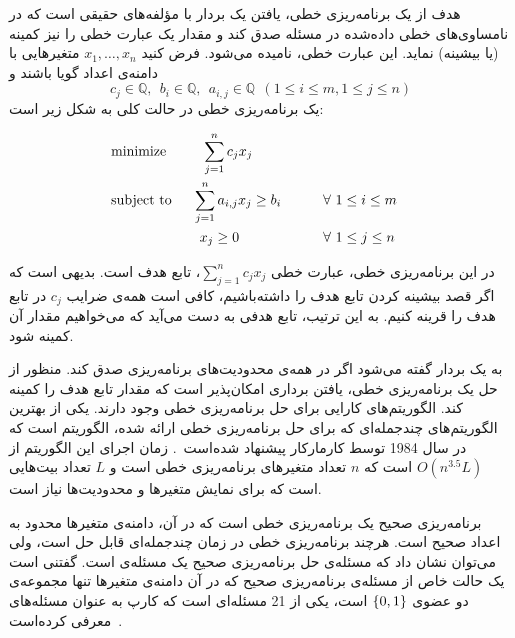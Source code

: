 هدف از یک برنامه‌ریزی خطی، یافتن یک بردار با مؤلفه‌های حقیقی است که در نامساوی‌های خطی داده‌شده در مسئله صدق کند و مقدار یک عبارت خطی را نیز کمینه (یا بیشینه) نماید. این عبارت خطی،  نامیده می‌شود. فرض کنید $x_{1}, \ldots, x_{n}$ متغیر‌هایی با دامنه‌ی اعداد گویا باشند و
$$c_{j} \in \mathbb{Q}, \ \ b_i \in \mathbb{Q}, \ \ a_{i, j} \in \mathbb{Q} \ \ (1 \leq i \leq m, 1 \leq j \leq n)$$
یک برنامه‌ریزی خطی در حالت کلی به شکل زیر است:
\begin{latin}
\begin{alignat}{3}
    & \text{minimize}  \quad && \ {\sum_{j=1}^{n} {c_{j} x_{j}}} \notag \\
    & \text{subject to}  \quad 
		&& \!\!{\sum_{j=1}^{n} {a_{i, j} x_{j}} \geq b_{i}} && \qquad {\forall \ 1 \leq i \leq m} \notag \\
    		&&& x_{j} \geq 0 && \qquad {\forall \ 1 \leq j \leq n} \notag
\end{alignat}
\end{latin}


در این برنامه‌ریزی خطی، عبارت خطی $\sum_{j=1}^{n} {c_{j} x_{j}}$، تابع هدف است. بدیهی است که اگر قصد بیشینه کردن تابع هدف را داشته‌باشیم، کافی است همه‌ی ضرایب $c_j$ در تابع هدف را قرینه کنیم. به این ترتیب، تابع هدفی به دست می‌آید که می‌خواهیم مقدار آن کمینه شود.

به یک بردار  گفته می‌شود اگر در همه‌ی محدودیت‌های برنامه‌ریزی صدق کند. منظور از حل یک برنامه‌ریزی خطی، یافتن برداری امکان‌پذیر است که مقدار تابع هدف را کمینه کند. الگوریتم‌های کارایی برای حل برنامه‌ریزی خطی وجود دارند. یکی از بهترین الگوریتم‌های چند‌جمله‌ای که برای حل برنامه‌ریزی خطی ارائه شده، الگوریتم
است که در سال 1984 توسط کارمارکار پیشنهاد شده‌است~\cite{LP-poly}. زمان اجرای این الگوریتم از $O(n^{3.5} L )$ است که $n$ تعداد متغیر‌های برنامه‌ریزی خطی است و $L$ تعداد بیت‌هایی است که برای نمایش متغیر‌ها و محدودیت‌ها نیاز است.


برنامه‌ریزی صحیح یک برنامه‌ریزی خطی است که در آن، دامنه‌ی متغیر‌ها محدود به اعداد صحیح است. هر‌چند برنامه‌ریزی‌ خطی در زمان چند‌جمله‌ای قابل حل است، ولی می‌توان نشان داد که مسئله‌ی حل برنامه‌ریزی صحیح یک مسئله‌ی  است. گفتنی است یک حالت خاص از مسئله‌ی برنامه‌ریزی صحیح که در آن دامنه‌ی متغیر‌ها تنها مجموعه‌ی دو عضوی ${\{ 0, 1 \}}$ است، یکی از 21 مسئله‌ای است که کارپ به عنوان مسئله‌های  معرفی کرده‌است~\cite{Karp}.

